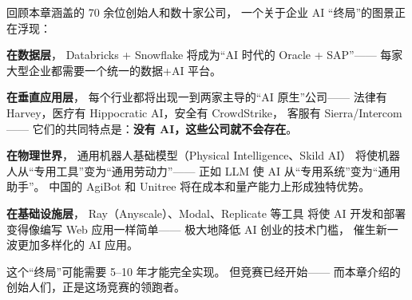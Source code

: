 \begin{whybox}[Enterprise AI 的``终局''猜想]
回顾本章涵盖的 70 余位创始人和数十家公司，
一个关于企业 AI ``终局''的图景正在浮现：

\textbf{在数据层}，
Databricks + Snowflake 将成为``AI 时代的 Oracle + SAP''——
每家大型企业都需要一个统一的数据+AI 平台。

\textbf{在垂直应用层}，
每个行业都将出现一到两家主导的``AI 原生''公司——
法律有 Harvey，医疗有 Hippocratic AI，安全有 CrowdStrike，
客服有 Sierra/Intercom——
它们的共同特点是：\textbf{没有 AI，这些公司就不会存在}。

\textbf{在物理世界}，
通用机器人基础模型（Physical Intelligence、Skild AI）
将使机器人从``专用工具''变为``通用劳动力''——
正如 LLM 使 AI 从``专用系统''变为``通用助手''。
中国的 AgiBot 和 Unitree 将在成本和量产能力上形成独特优势。

\textbf{在基础设施层}，
Ray（Anyscale）、Modal、Replicate 等工具
将使 AI 开发和部署变得像编写 Web 应用一样简单——
极大地降低 AI 创业的技术门槛，
催生新一波更加多样化的 AI 应用。

这个``终局''可能需要 5--10 年才能完全实现。
但竞赛已经开始——
而本章介绍的创始人们，正是这场竞赛的领跑者。
\end{whybox}
